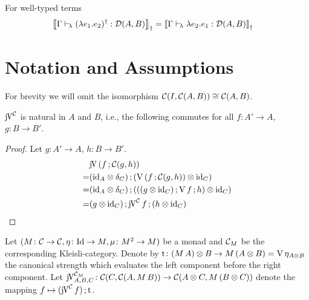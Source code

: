 \documentclass[runningheads,envcountsame]{llncs}
\newcommand{\monad}{M}
\begin{document}
\begin{lemma}
    For well-typed terms
    \begin{align} 
        \semD{\typerulel{\Gamma}{\rev{(\elam{e_1}{e_2})}}{\homD{A}{B}}} &= \semD{\typerulel{\Gamma}{\elam{e_2}{e_1}}{\homD{A}{B}}}
    \end{align}
\end{lemma}

\appendix

\section{Notation and Assumptions}

For brevity we will omit the isomorphism $\mathcal{C}(I, \mathcal{C}(A, B)) \cong \mathcal{C}(A, B)$. 

\begin{lemma}
    $\juncurry[\C]$ is natural in $A$ and $B$, i.e., the following commutes for all $f\colon A' \to A$, $g\colon B \to B'$.
    \begin{center}
    \end{center}
\end{lemma}
\begin{proof}
    Let $g\colon A' \to A$, $h\colon B \to B'$.
    \begin{align}
        & \juncurry\,(\comp{f}{\homC{g}{h}}) \\
      = & \comp{(\tensor{\id_A}{\dup_C})}{(\tensor{\uncurry\,(\comp{f}{\homC{g}{h})}}{\id_C})} \\
      = & \comp{(\tensor{\id_A}{\dup_C})}{(\tensor{(\comp{(\tensor{g}{\id_C})}{\comp{\uncurry\,f}{h}})}{\id_C})} \\
      = & \comp{(\tensor{g}{\id_C})}{\comp{\juncurry[\C]\,f}{(\tensor{h}{\id_C})}}
    \end{align}
\end{proof}

Let $(\monad\colon \C \to \C, \munit\colon \Id \to \monad, \mjoin\colon  \monad^2 \to \monad)$ be a monad and $\C_\monad$ be the corresponding Kleisli-category. Denote by $\mstrength\colon \tensor{(\monad\,A)}{B} \to \monad\,(\tensor{A}{B}) = \uncurry\,\munit_{\tensor{A}{B}}$ the canonical strength which evaluates the left component before the right component.
Let $\juncurry[\C_\monad]_{A,B,C} \colon \C(C, \homC{A}{\monad\,B}) \to \C(\tensor{A}{C}, \monad\,(\tensor{B}{C}))$ denote the mapping $f \mapsto \comp{(\juncurry[\C]\,f)}{\mstrength}$.
\end{document}
